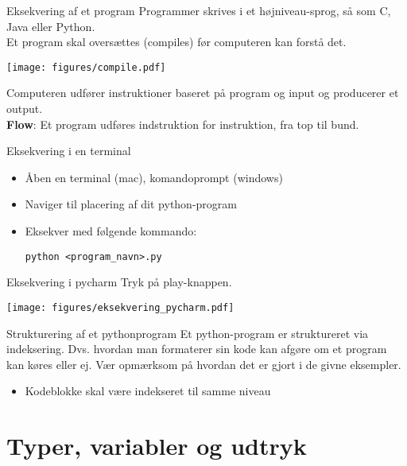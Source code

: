 \begin{frame}{Eksekvering af et program}
	Programmer skrives i et højniveau-sprog, så som C, Java eller Python.\\
	Et program skal oversættes (compiles) før computeren kan forstå det.\\

	\begin{center}
		\texttt{[image: figures/compile.pdf]}
	\end{center}

	Computeren udfører instruktioner baseret på program og input og producerer et output.\\
	\textbf{Flow}: Et program udføres indstruktion for instruktion, fra top til bund.
\end{frame}

\begin{frame}[fragile]{Eksekvering i en terminal}
	\begin{itemize}
		\item Åben en terminal (mac), komandoprompt (windows)
		\item Naviger til placering af dit python-program
		\item Eksekver med følgende kommando:
		\begin{lstlisting}[style=terminal]
python <program_navn>.py
		\end{lstlisting}
	\end{itemize}
	
\end{frame}

\begin{frame}{Eksekvering i pycharm}
	Tryk på play-knappen.
			\begin{center}
				\texttt{[image: figures/eksekvering\_pycharm.pdf]}
			\end{center}
\end{frame}


\begin{frame}{Strukturering af et pythonprogram}
	Et python-program er struktureret via indeksering. Dvs. hvordan man formaterer sin kode kan afgøre om et program kan køres eller ej. Vær opmærksom på hvordan det er gjort i de givne eksempler.
	\begin{itemize}
		\item Kodeblokke skal være indekseret til samme niveau
	\end{itemize}
\end{frame}

\section{Typer, variabler og udtryk}

